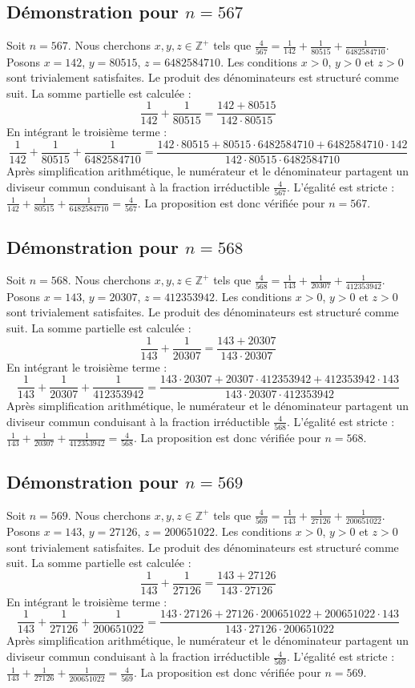 \documentclass[11pt,a4paper]{article}
\begin{document}
\subsection{Démonstration pour $n = 567$}
Soit $n = 567$. Nous cherchons $x, y, z \in \mathbb{Z}^{+}$ tels que $\frac{4}{567} = \frac{1}{142} + \frac{1}{80515} + \frac{1}{6482584710}$.
Posons $x = 142$, $y = 80515$, $z = 6482584710$.
Les conditions $x > 0$, $y > 0$ et $z > 0$ sont trivialement satisfaites.
Le produit des dénominateurs est structuré comme suit. La somme partielle est calculée :
$$ \frac{1}{142} + \frac{1}{80515} = \frac{142+80515}{142 \cdot 80515} $$
En intégrant le troisième terme :
$$ \frac{1}{142} + \frac{1}{80515} + \frac{1}{6482584710} = \frac{142 \cdot 80515 + 80515 \cdot 6482584710 + 6482584710 \cdot 142}{142 \cdot 80515 \cdot 6482584710} $$
Après simplification arithmétique, le numérateur et le dénominateur partagent un diviseur commun conduisant à la fraction irréductible $\frac{4}{567}$.
L'égalité est stricte : $\frac{1}{142} + \frac{1}{80515} + \frac{1}{6482584710} = \frac{4}{567}$.
La proposition est donc vérifiée pour $n = 567$.
\subsection{Démonstration pour $n = 568$}
Soit $n = 568$. Nous cherchons $x, y, z \in \mathbb{Z}^{+}$ tels que $\frac{4}{568} = \frac{1}{143} + \frac{1}{20307} + \frac{1}{412353942}$.
Posons $x = 143$, $y = 20307$, $z = 412353942$.
Les conditions $x > 0$, $y > 0$ et $z > 0$ sont trivialement satisfaites.
Le produit des dénominateurs est structuré comme suit. La somme partielle est calculée :
$$ \frac{1}{143} + \frac{1}{20307} = \frac{143+20307}{143 \cdot 20307} $$
En intégrant le troisième terme :
$$ \frac{1}{143} + \frac{1}{20307} + \frac{1}{412353942} = \frac{143 \cdot 20307 + 20307 \cdot 412353942 + 412353942 \cdot 143}{143 \cdot 20307 \cdot 412353942} $$
Après simplification arithmétique, le numérateur et le dénominateur partagent un diviseur commun conduisant à la fraction irréductible $\frac{4}{568}$.
L'égalité est stricte : $\frac{1}{143} + \frac{1}{20307} + \frac{1}{412353942} = \frac{4}{568}$.
La proposition est donc vérifiée pour $n = 568$.
\subsection{Démonstration pour $n = 569$}
Soit $n = 569$. Nous cherchons $x, y, z \in \mathbb{Z}^{+}$ tels que $\frac{4}{569} = \frac{1}{143} + \frac{1}{27126} + \frac{1}{200651022}$.
Posons $x = 143$, $y = 27126$, $z = 200651022$.
Les conditions $x > 0$, $y > 0$ et $z > 0$ sont trivialement satisfaites.
Le produit des dénominateurs est structuré comme suit. La somme partielle est calculée :
$$ \frac{1}{143} + \frac{1}{27126} = \frac{143+27126}{143 \cdot 27126} $$
En intégrant le troisième terme :
$$ \frac{1}{143} + \frac{1}{27126} + \frac{1}{200651022} = \frac{143 \cdot 27126 + 27126 \cdot 200651022 + 200651022 \cdot 143}{143 \cdot 27126 \cdot 200651022} $$
Après simplification arithmétique, le numérateur et le dénominateur partagent un diviseur commun conduisant à la fraction irréductible $\frac{4}{569}$.
L'égalité est stricte : $\frac{1}{143} + \frac{1}{27126} + \frac{1}{200651022} = \frac{4}{569}$.
La proposition est donc vérifiée pour $n = 569$.
\end{document}
